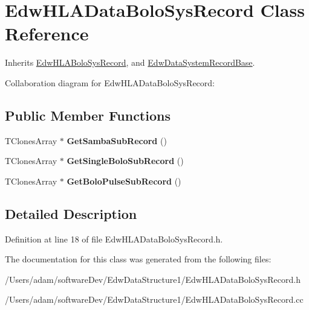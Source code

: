 \hypertarget{class_edw_h_l_a_data_bolo_sys_record}{
\section{EdwHLADataBoloSysRecord Class Reference}
\label{class_edw_h_l_a_data_bolo_sys_record}
}


Inherits \hyperlink{class_edw_h_l_a_bolo_sys_record}{EdwHLABoloSysRecord}, and \hyperlink{class_edw_data_system_record_base}{EdwDataSystemRecordBase}.



Collaboration diagram for EdwHLADataBoloSysRecord:\subsection*{Public Member Functions}
\begin{DoxyCompactItemize}
\item 
\hypertarget{class_edw_h_l_a_data_bolo_sys_record_a42da51c0de42d136a4622ced1d164f3b}{
TClonesArray $\ast$ {\bfseries GetSambaSubRecord} ()}
\label{class_edw_h_l_a_data_bolo_sys_record_a42da51c0de42d136a4622ced1d164f3b}

\item 
\hypertarget{class_edw_h_l_a_data_bolo_sys_record_ae631b3900b6bd2950597132278ba9fc2}{
TClonesArray $\ast$ {\bfseries GetSingleBoloSubRecord} ()}
\label{class_edw_h_l_a_data_bolo_sys_record_ae631b3900b6bd2950597132278ba9fc2}

\item 
\hypertarget{class_edw_h_l_a_data_bolo_sys_record_abdce176e1c98b0d30c7d98263a3a3b5d}{
TClonesArray $\ast$ {\bfseries GetBoloPulseSubRecord} ()}
\label{class_edw_h_l_a_data_bolo_sys_record_abdce176e1c98b0d30c7d98263a3a3b5d}

\end{DoxyCompactItemize}


\subsection{Detailed Description}


Definition at line 18 of file EdwHLADataBoloSysRecord.h.



The documentation for this class was generated from the following files:\begin{DoxyCompactItemize}
\item 
/Users/adam/softwareDev/EdwDataStructure1/EdwHLADataBoloSysRecord.h\item 
/Users/adam/softwareDev/EdwDataStructure1/EdwHLADataBoloSysRecord.cc\end{DoxyCompactItemize}
